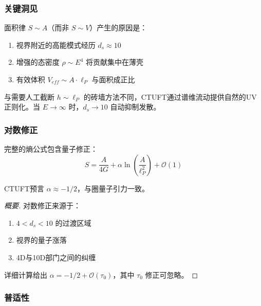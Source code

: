 \subsubsection{关键洞见}

\begin{insight}[来自维流动的面积律]
面积律 $S \sim A$（而非 $S \sim V$）产生的原因是：
\begin{enumerate}
    \item 视界附近的高能模式经历 $d_s \approx 10$
    \item 增强的态密度 $\rho \sim E^4$ 将贡献集中在薄壳
    \item 有效体积 $V_{eff} \sim A \cdot \ell_P$ 与面积成正比
\end{enumerate}
\end{insight}

\begin{insight}[自然正则化]
与需要人工截断 $h \sim \ell_P$ 的砖墙方法不同，CTUFT通过谱维流动提供自然的UV正则化。当 $E \to \infty$ 时，$d_s \to 10$ 自动抑制发散。
\end{insight}

\subsubsection{对数修正}

完整的熵公式包含量子修正：
\begin{equation}
S = \frac{A}{4G} + \alpha \ln\left(\frac{A}{\ell_P^2}\right) + \mathcal{O}(1)
\end{equation}

\begin{theorem}[对数修正系数]
CTUFT预言 $\alpha \approx -1/2$，与圈量子引力一致。
\end{theorem}

\begin{proof}[概要]
对数修正来源于：
\begin{enumerate}
    \item $4 < d_s < 10$ 的过渡区域
    \item 视界的量子涨落
    \item 4D与10D部门之间的纠缠
\end{enumerate}

详细计算给出 $\alpha = -1/2 + \mathcal{O}(\tau_0)$，其中 $\tau_0$ 修正可忽略。
\end{proof}

\subsubsection{普适性}

